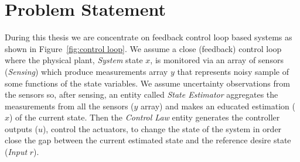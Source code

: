 \documentclass[ twoside, 12pt ]{article}
\newcommand{\commentOut}[1]{}
\begin{document}
\commentOut{ %
In this work we show how to combine the efficiency of dynamic scheduling with the predictability of real-time scheduling, in a way that is more suitable for control systems then periods and deadlines.
We show that applying control computations at dynamically adjustable periodic, and with variable computational demands, based on real-time information, allows for better utilization of the computational resources and therefor better control performance.

The main innovation of this work is the system architecture design.
In practice most of the real-time control systems designs consists of to separated elements, (1) control and estimations tasks, and (2) a task scheduler which divide the resources (CPU time) between all tasks. 
Although those two parts are constantly affected by each other they barely communicate, this lead to static (constant) scheduling regardless of the current state or needs of the system.
In this thesis we develop an architecture design for control systems in witch the scheduler (2) is aware of the current state of the system, and makes \textit{state depended} scheduling for that state. 
We show how allocate resources by \textbf{current} needs give better resoults than allocate resources for the \textbf{worst-case} needs.
}
 
\section{Problem Statement}
\label{sec:Problem}
During this thesis we are concentrate on feedback control loop based systems as shown in Figure~\ref{fig:control loop}. 
We assume a close (feedback) control loop where the physical plant, \textit{System} state $x$, is monitored via an array of sensors (\textit{Sensing}) which produce measurements array $y$ that represents noisy sample of some functions of the state variables. 
We assume uncertainty observations from the sensors so, after sensing, an entity called \textit{State Estimator} aggregates the measurements from all the sensors ($y$ array) and makes an educated estimation ($\hat{x}$) of the current state. Then the \textit{Control Law} entity generates the controller outputs ($u$), control the actuators, to change the state of the system in order close the gap between the current estimated state and the reference desire state (\textit{Input} $r$).
\end{document}
